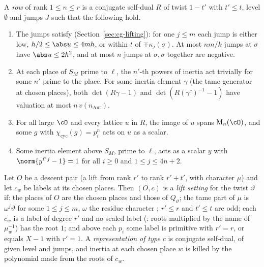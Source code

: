 \begin{definition}\label{cg-selmer:def:row}
A \emph{row} of rank $1\le n\le r$ is a conjugate self-dual $R$ of twist $1-t'$ with $t'\le t$, level
$\emptyset$ and jumps $J$ such that the following hold.
\begin{enumerate}[label=(\roman*)]
\item The jumps satisfy  (Section~\ref{sec:cg-lifting}):
  for one $j\le m$ each jump is either low, $h/2\le\abs u\le4mh$, or within
  $t$ of $\mp\kappa_j(\sigma)$. At most $nm/k$ jumps at $\sigma$ have $\abs u\le2h^2$, and at most
  $n$ jumps at $\sigma,\bar\sigma$ together are negative.
\item At each place of $S_M$ prime to $\ell$, the $n'$-th powers of inertia act trivially for some
  $n'$ prime to the place. For some inertia element $\gamma$ (the tame generator at chosen places), both
  $\det(R\gamma-1)$ and $\det(R(\gamma^c)^{-1}-1)$ have valuation at most $n\,v(n_{\mathrm{Aut}})$.
\item For all large $\cO$ and every lattice $u$ in $R$, the image of $u$ spans $\mathrm M_n(\cO)$, and some
  $g$ with $\chi_{\mathrm{cyc}}(g)=p_i^n$ acts on $u$ as a scalar.
\item Some inertia element above $S_M$, prime to $\ell$, acts as a scalar $y$ with
  $\norm{y^{\ell^ij}-1}=1$ for all $i\ge0$ and $1\le j\le4n+2$.
\end{enumerate}
\end{definition}

\begin{definition}
\label{cg-selmer:def:setting}
Let $O$ be a descent pair (a lift from rank $r'$ to rank $r'+t'$, with character $\mu$) and let
$c_w$ be labels at its chosen places. Then $(O,c)$ is a \emph{lift setting} for the twist $\vartheta$
if: the places of $O$ are the chosen places and those of $Q_\vartheta$; the tame part of $\mu$ is
$\omega^j\vartheta$ for some $1\le j\le m$, $\omega$ the residue character ;
$r'\le r$ and $t'\le t$ are odd; each $c_w$ is a label of degree $r'$ and no scaled label
(: roots multiplied by the name of $\mu_w^{-1}$) has the root $1$;
and above each $p_i$ some label is primitive with $r'=r$, or equals $X-1$ with $r'=1$.
A \emph{representation of type $c$} is conjugate self-dual, of given level and jumps, and inertia
at each chosen place $w$ is killed by the polynomial made from the roots of $c_w$.
\end{definition}

